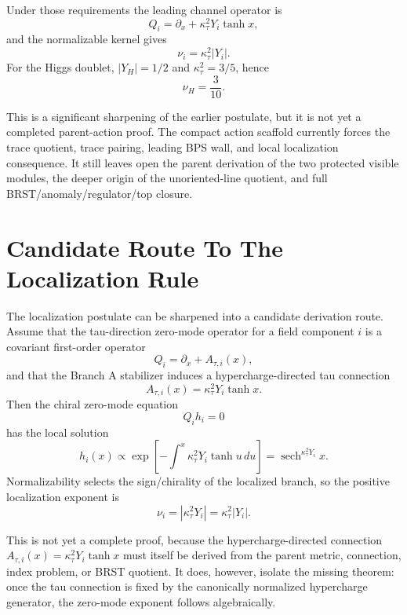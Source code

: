 \documentclass[11pt]{article}
\begin{document}
Under those requirements the leading channel operator is
\begin{equation}
Q_i=\partial_x+\kappa_\tau^2Y_i\tanh x,
\end{equation}
and the normalizable kernel gives
\begin{equation}
\nu_i=\kappa_\tau^2|Y_i|.
\end{equation}
For the Higgs doublet, $|Y_H|=1/2$ and $\kappa_\tau^2=3/5$, hence
\begin{equation}
\nu_H=\frac3{10}.
\end{equation}

This is a significant sharpening of the earlier postulate, but it is not yet a
completed parent-action proof.  The compact action scaffold currently forces
the trace quotient, trace pairing, leading BPS wall, and local localization
consequence.  It still leaves open the parent derivation of the two protected
visible modules, the deeper origin of the unoriented-line quotient, and full
BRST/anomaly/regulator/top closure.

\section{Candidate Route To The Localization Rule}
The localization postulate can be sharpened into a candidate derivation route.
Assume that the tau-direction zero-mode operator for a field component $i$ is a
covariant first-order operator
\begin{equation}
Q_i=\partial_x + A_{\tau,i}(x),
\end{equation}
and that the Branch A stabilizer induces a hypercharge-directed tau connection
\begin{equation}
A_{\tau,i}(x)=\kappa_\tau^2 Y_i \tanh x .
\end{equation}
Then the chiral zero-mode equation
\begin{equation}
Q_i h_i=0
\end{equation}
has the local solution
\begin{equation}
h_i(x)\propto \exp\left[-\int^x\kappa_\tau^2 Y_i\tanh u\,du\right]
=\operatorname{sech}^{\kappa_\tau^2 Y_i}x .
\end{equation}
Normalizability selects the sign/chirality of the localized branch, so the
positive localization exponent is
\begin{equation}
\nu_i=\left|\kappa_\tau^2 Y_i\right|=\kappa_\tau^2|Y_i| .
\end{equation}

This is not yet a complete proof, because the hypercharge-directed connection
$A_{\tau,i}(x)=\kappa_\tau^2Y_i\tanh x$ must itself be derived from the parent
metric, connection, index problem, or BRST quotient. It does, however, isolate
the missing theorem: once the tau connection is fixed by the canonically
normalized hypercharge generator, the zero-mode exponent follows algebraically.
\end{document}
